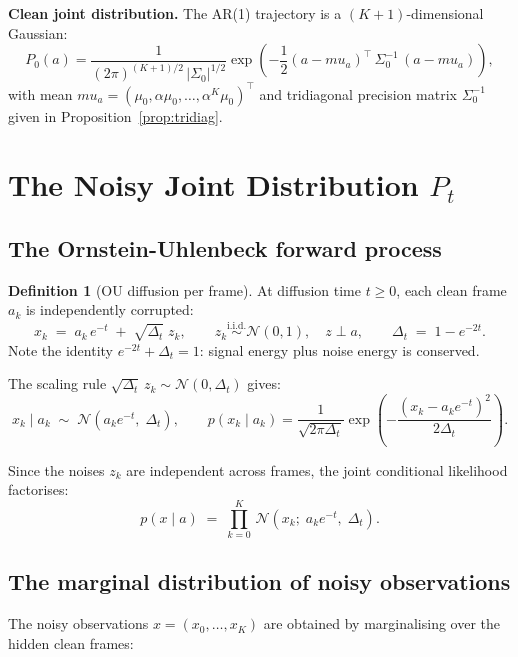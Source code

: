 \documentclass[12pt, a4paper]{article}
\def\ba{a}%
\def\bx{x}%
\def\bmu{mu}%
\def\bm#1{#1}%
\theoremstyle{definition}
\newtheorem{definition}{Definition}[section]
\newcommand{\N}{\mathcal{N}}
\newcommand{\ba}{\bm{a}}
\newcommand{\bx}{\bm{x}}
\newcommand{\bmu}{\bm{\mu}}
\newcommand{\dt}{\Delta_t}
\begin{document}
\begin{resultbox}
\textbf{Clean joint distribution.} The AR(1) trajectory is a
$(K+1)$-dimensional Gaussian:
\[
  \boxed{
  P_0(\ba)
  = \frac{1}{(2\pi)^{(K+1)/2}\,|\Sigma_0|^{1/2}}
    \exp\!\left(
      -\frac{1}{2}(\ba - \bmu_a)^\top\,\Sigma_0^{-1}\,(\ba - \bmu_a)
    \right),}
\]
with mean $\bmu_a = (\mu_0, \alpha\mu_0, \ldots, \alpha^K\mu_0)^\top$
and tridiagonal precision matrix $\Sigma_0^{-1}$ given in
Proposition~\ref{prop:tridiag}.
\end{resultbox}

\section{The Noisy Joint Distribution \texorpdfstring{$P_t$}{Pt}}

\subsection{The Ornstein-Uhlenbeck forward process}

\begin{definition}[OU diffusion per frame]
At diffusion time $t \geq 0$, each clean frame $a_k$ is independently
corrupted:
\[
  x_k \;=\; a_k\,e^{-t} \;+\; \sqrt{\dt}\;z_k,
  \qquad
  z_k \overset{\mathrm{i.i.d.}}{\sim} \N(0,1),
  \quad
  \bm{z} \perp \ba,
  \qquad
  \dt \;=\; 1 - e^{-2t}.
\]
Note the identity $e^{-2t} + \dt = 1$: signal energy plus noise energy
is conserved.
\end{definition}

The scaling rule $\sqrt{\dt}\,z_k \sim \N(0, \dt)$ gives:
\[
  x_k \mid a_k \;\sim\; \N\!\left(a_k e^{-t},\; \dt\right),
  \qquad
  p(x_k\mid a_k)
  = \frac{1}{\sqrt{2\pi\dt}}
    \exp\!\left(-\frac{(x_k - a_k e^{-t})^2}{2\dt}\right).
\]

Since the noises $z_k$ are independent across frames, the joint
conditional likelihood factorises:
\[
  p(\bx \mid \ba)
  \;=\;
  \prod_{k=0}^{K}\,\N\!\left(x_k;\; a_k e^{-t},\; \dt\right).
\]

\subsection{The marginal distribution of noisy observations}

The noisy observations $\bx = (x_0, \ldots, x_K)$ are obtained by
marginalising over the hidden clean frames:
\end{document}
